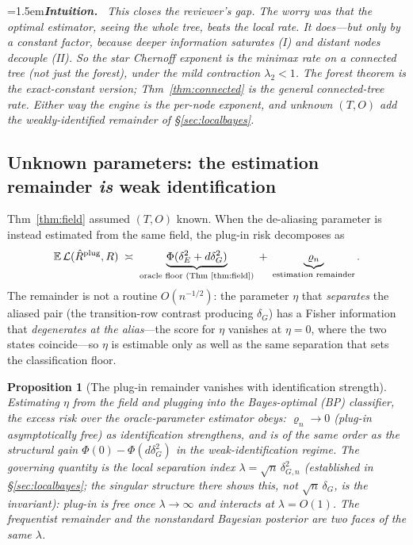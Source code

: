 \documentclass[11pt]{article}
\newtheorem{proposition}{Proposition}
\newenvironment{intuition}{\par\smallskip\noindent\hangindent=1.5em\textbf{\itshape Intuition.}\itshape\ \ignorespaces}{\par\smallskip}
\begin{document}
\begin{intuition}
This closes the reviewer's gap. The worry was that the optimal estimator, seeing the whole tree, beats the local
rate. It does---but only by a \emph{constant} factor, because deeper information \emph{saturates} (I) and distant
nodes \emph{decouple} (II). So the star Chernoff exponent is the minimax \emph{rate} on a connected tree (not just
the forest), under the mild contraction $\lambda_2<1$. The forest theorem is the exact-constant version;
Thm~\ref{thm:connected} is the general connected-tree rate. Either way the engine is the per-node exponent, and
unknown $(T,O)$ add the weakly-identified remainder of \S\ref{sec:localbayes}.
\end{intuition}

\subsection{Unknown parameters: the estimation remainder \emph{is} weak identification}\label{sec:unknown}
Thm~\ref{thm:field} assumed $(T,O)$ known. When the de-aliasing parameter is instead estimated from the same
field, the plug-in risk decomposes as
\[
   \mathbb{E}\,\mathcal L(\hat R^{\text{plug}},R)\;\asymp\;\underbrace{\Phi(\delta_E^2+d\delta_G^2)}_{\text{oracle floor (Thm~\ref{thm:field})}}\;+\;\underbrace{\varrho_n}_{\text{estimation remainder}} .
\]
The remainder is not a routine $O(n^{-1/2})$: the parameter $\eta$ that \emph{separates} the aliased pair (the
transition-row contrast producing $\delta_G$) has a Fisher information that \emph{degenerates at the alias}---the
score for $\eta$ vanishes at $\eta{=}0$, where the two states coincide---so $\eta$ is estimable only as well as
the same separation that sets the classification floor.
\begin{proposition}[The plug-in remainder vanishes with identification strength]\label{prop:unknown}
Estimating $\eta$ from the field and plugging into the Bayes-optimal (BP) classifier, the excess risk over the
oracle-parameter estimator obeys: $\varrho_n\to0$ (\emph{plug-in asymptotically free}) as identification
strengthens, and is of the \emph{same order as the structural gain} $\Phi(0)-\Phi(d\delta_G^2)$ in the
weak-identification regime. The governing quantity is the local separation index
$\lambda=\sqrt n\,\delta_{G,n}^2$ (established in \S\ref{sec:localbayes}; the singular structure there shows this,
\emph{not} $\sqrt n\,\delta_G$, is the invariant): plug-in is free once $\lambda\to\infty$ and interacts at
$\lambda=O(1)$. The frequentist remainder and the nonstandard Bayesian posterior are two faces of the same
$\lambda$.
\end{proposition}
\end{document}

